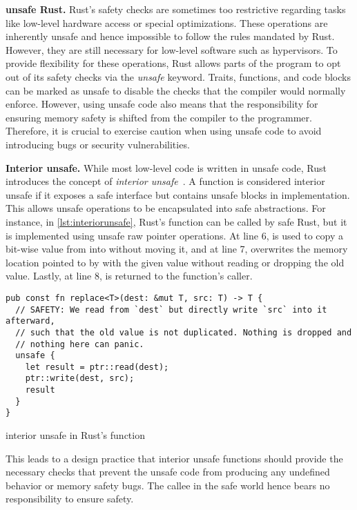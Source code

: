 \textbf{unsafe Rust.}
Rust's safety checks are sometimes too restrictive regarding tasks like
low-level hardware access or special optimizations. These operations are
inherently unsafe and hence impossible to follow the rules mandated by Rust.
However, they are still necessary for low-level software such as
hypervisors. To provide flexibility for these operations, Rust allows
parts of the program to opt out of its safety checks via the \textit{unsafe}
keyword. Traits, functions, and code blocks can be marked as unsafe to disable
the checks that the compiler would normally enforce. However, using unsafe code
also means that the responsibility for ensuring memory safety is shifted from
the compiler to the programmer. Therefore, it is crucial to exercise
caution when using unsafe code to avoid introducing bugs or security
vulnerabilities.

\textbf{Interior unsafe.}
While most low-level code is written in unsafe code, Rust introduces
the concept of \textit{interior unsafe}~\cite{ruststudy}. A function is considered
interior unsafe if it exposes a safe interface but contains unsafe blocks
in implementation. This allows unsafe operations to be encapsulated
into safe abstractions. For instance, in
\autoref{lst:interiorunsafe}, Rust's  function can be
called by safe Rust, but it is implemented using unsafe raw pointer operations.
At line 6,  is used to copy a bit-wise value from 
into  without moving it, and at line 7,  overwrites
the memory location pointed to by  with the given value 
without reading or dropping the old value. Lastly, at line 8,  is
returned to the function's caller.

\begin{listing}[hbtp]
    \begin{verbatim}
pub const fn replace<T>(dest: &mut T, src: T) -> T {
  // SAFETY: We read from `dest` but directly write `src` into it afterward,
  // such that the old value is not duplicated. Nothing is dropped and
  // nothing here can panic.
  unsafe {
    let result = ptr::read(dest);
    ptr::write(dest, src);
    result
  }
}
    \end{verbatim}
    \caption{interior unsafe in Rust's  function}
    \label{lst:interiorunsafe}
    \vspace{-0.2cm}
\end{listing}

This leads to a design practice that interior unsafe functions should provide
the necessary checks that prevent the unsafe code from producing any undefined
behavior or memory safety bugs.
The callee in the safe world hence bears no responsibility to ensure safety.

